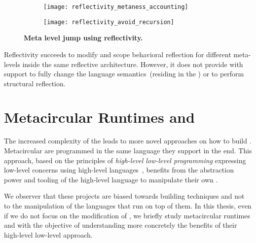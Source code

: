 \begin{figure}[ht]
\begin{center}
\begin{subfigure}{.45\textwidth}
\texttt{[image: reflectivity\_metaness\_accounting]}
\end{subfigure}
\begin{subfigure}{.45\textwidth}
\texttt{[image: reflectivity\_avoid\_recursion]}
\end{subfigure}
\caption{\textbf{Meta level jump using reflectivity.}\label{fig:reflectivity_avoid_meta_recursion}
 }
\end{center}
\end{figure}

Reflectivity succeeds to modify and scope behavioral reflection for different meta-levels inside the same reflective architecture. However, it does not provide with support to fully change the language semantics~(residing in the \VM) or to perform structural reflection.

\section{Metacircular Runtimes and \VMs}\label{sec:metacircular_runtimes}

The increased complexity of the \VMs leads to more novel approaches on how to build \VMs.
Metacircular \VMs are \VMs programmed in the same language they support in the end. This approach, based on the principles of \emph{high-level low-level programming} \ie expressing low-level concerns using high-level languages~\cite{Fram09a}, benefits from the abstraction power and tooling of the high-level language to manipulate their own \VMs. 

We observer that these projects are biased towards \VM building techniques and not to the manipulation of the languages that run on top of them.
In this thesis, even if we do not focus on the modification of \VMs, we briefly study metacircular runtimes and \VMs with the objective of understanding more concretely the benefits of their high-level low-level approach.

